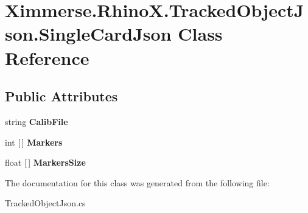 \hypertarget{class_ximmerse_1_1_rhino_x_1_1_tracked_object_json_1_1_single_card_json}{}\section{Ximmerse.\+Rhino\+X.\+Tracked\+Object\+Json.\+Single\+Card\+Json Class Reference}
\label{class_ximmerse_1_1_rhino_x_1_1_tracked_object_json_1_1_single_card_json}
\subsection*{Public Attributes}
\begin{DoxyCompactItemize}
\item 
\mbox{\label{class_ximmerse_1_1_rhino_x_1_1_tracked_object_json_1_1_single_card_json_a9aef6e07c7e7e406f6a065126c8c393f}} 
string {\bfseries Calib\+File}
\item 
\mbox{\label{class_ximmerse_1_1_rhino_x_1_1_tracked_object_json_1_1_single_card_json_a90f40e3af9ed6640a155e9f98d9865fa}} 
int \mbox{[}$\,$\mbox{]} {\bfseries Markers}
\item 
\mbox{\label{class_ximmerse_1_1_rhino_x_1_1_tracked_object_json_1_1_single_card_json_a989379cc26e8ecf8da262c5bc8890141}} 
float \mbox{[}$\,$\mbox{]} {\bfseries Markers\+Size}
\end{DoxyCompactItemize}


The documentation for this class was generated from the following file\+:\begin{DoxyCompactItemize}
\item 
Tracked\+Object\+Json.\+cs\end{DoxyCompactItemize}

